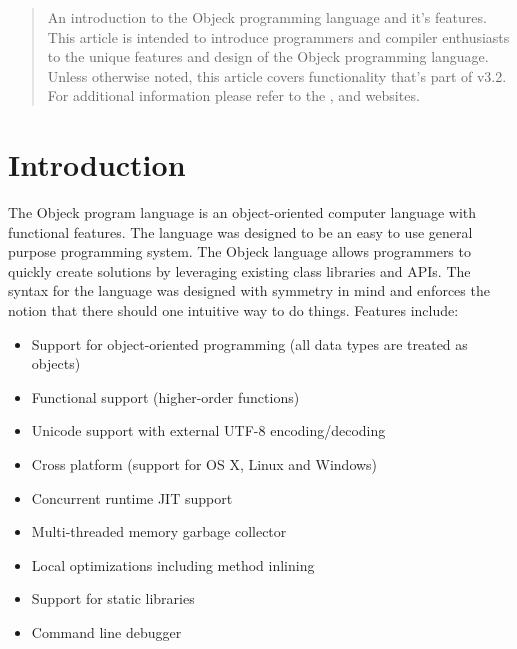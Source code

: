 \documentclass[11pt]{article}
\begin{document}
\maketitle
\thispagestyle{empty}

\vspace{\baselineskip}

\begin{abstract}
  An introduction to the Objeck programming language and it's
  features.  This article is intended to introduce programmers and
  compiler enthusiasts to the unique features and design of the Objeck
  programming language.  Unless otherwise noted, this article covers
  functionality that's part of v3.2.  For additional information
  please refer to the
  ,
  and
  websites.
\end{abstract}

\newpage
\tableofcontents
\newpage

\label{Introduction}
\section{Introduction}
The Objeck program language is an object-oriented computer language
with functional features.  The language was designed to be an easy to
use general purpose programming system.  The Objeck language allows
programmers to quickly create solutions by leveraging existing class
libraries and APIs.  The syntax for the language was designed with
symmetry in mind and enforces the notion that there should one
intuitive way to do things. Features include:
\begin{itemize}
\item Support for object-oriented programming (all data types are
  treated as objects)
\item Functional support (higher-order functions)
\item Unicode support with external UTF-8 encoding/decoding
\item Cross platform (support for OS X, Linux and Windows)
\item Concurrent runtime JIT support
\item Multi-threaded memory garbage collector
\item Local optimizations including method inlining
\item Support for static libraries
\item Command line debugger
\end{itemize}
\end{document}
